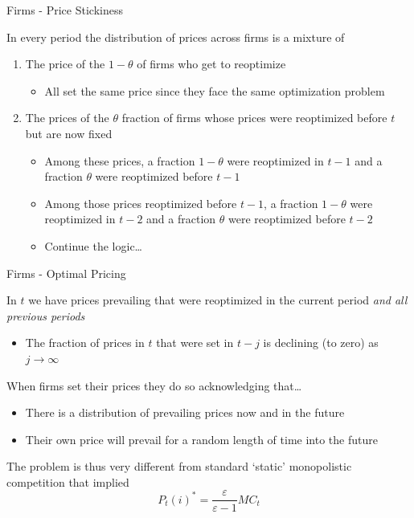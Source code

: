 \documentclass{beamer}
\begin{document}
\begin{frame}{Firms - Price Stickiness}

In every period  the distribution of prices across firms is a mixture of
\begin{enumerate}
\item	The price of the $1-\theta$ of firms who get to reoptimize
	\begin{itemize}
	\item	All set the same price since they face the same optimization problem
	\end{itemize}
\item	The prices of the $\theta$ fraction of firms whose prices were reoptimized before $t$ but are now fixed
	\begin{itemize}
	\item	Among these prices, a fraction $1-\theta$ were reoptimized in $t-1$ and a fraction $\theta$ were reoptimized before $t-1$
	\item	Among those prices reoptimized before $t-1$, a fraction $1-\theta$ were reoptimized in $t-2$ and a fraction $\theta$ were reoptimized before $t-2$
	\item	Continue the logic\ldots
	\end{itemize}
\end{enumerate}

\end{frame}


	
\begin{frame}{Firms - Optimal Pricing}

In $t$ we have prices prevailing that were reoptimized in the current period \emph{and all previous periods}
\begin{itemize}
\item	The fraction of prices in $t$ that were set in $t-j$ is declining (to zero) as $j\rightarrow \infty$
\end{itemize} 

\vspace{2mm}
When firms set their prices they do so acknowledging that\ldots
\begin{itemize}
\item	There is a distribution of prevailing prices now and in the future
\item	Their own price will prevail for a random length of time into the future
\end{itemize}

\vspace{2mm}
The problem is thus very different from standard `static' monopolistic competition that implied
\[
P_{t}(i)^{\ast} = \frac{\varepsilon}{\varepsilon-1} MC_{t}
\]

\end{frame}
\end{document}
